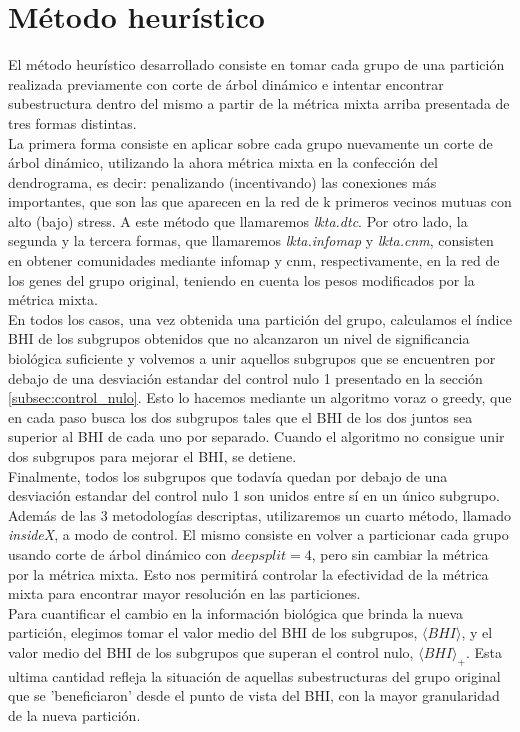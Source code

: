 \section{Método heurístico}
El método heurístico desarrollado consiste en tomar cada grupo de una partición realizada previamente con corte de árbol dinámico e intentar encontrar subestructura dentro del mismo a partir de la métrica mixta arriba presentada de tres formas distintas.\\
La primera forma consiste en aplicar sobre cada grupo nuevamente un corte de árbol dinámico, utilizando la ahora métrica mixta en la confección del dendrograma, es decir: penalizando (incentivando) las conexiones más importantes, que son las que aparecen en la red de k primeros vecinos mutuas con alto (bajo) stress. A este método que llamaremos \textit{lkta.dtc}. Por otro lado, la segunda y la tercera formas, que llamaremos \textit{lkta.infomap} y \textit{lkta.cnm}, consisten en obtener comunidades mediante infomap y cnm, respectivamente, en la red de los genes del grupo original, teniendo en cuenta los pesos modificados por la métrica mixta.\\
En todos los casos, una vez obtenida una partición del grupo, calculamos el índice BHI de los subgrupos obtenidos que no alcanzaron un nivel de significancia biológica suficiente y volvemos a unir aquellos subgrupos que se encuentren por debajo de una desviación estandar del control nulo 1 presentado en la sección \ref{subsec:control_nulo}. Esto lo hacemos mediante un algoritmo voraz o greedy, que en cada paso busca los dos subgrupos tales que el BHI de los dos juntos sea superior al BHI de cada uno por separado. Cuando el algoritmo no consigue unir dos subgrupos para mejorar el BHI, se detiene.\\ Finalmente, todos los subgrupos que todavía quedan por debajo de una desviación estandar del control nulo 1 son unidos entre sí en un único subgrupo.\\
Además de las 3 metodologías descriptas, utilizaremos un cuarto método, llamado \textit{insideX}, a modo de control. El mismo consiste en volver a particionar cada grupo usando corte de árbol dinámico con $deepsplit=4$, pero sin cambiar la métrica por la métrica mixta. Esto nos permitirá controlar la efectividad de la métrica mixta para encontrar mayor resolución en las particiones.\\
Para cuantificar el cambio en la información biológica que brinda la nueva partición, elegimos tomar el valor medio del BHI de los subgrupos, $\langle BHI \rangle$, y el valor medio del BHI de los subgrupos que superan el control nulo, $\langle BHI \rangle _{+}$. Esta ultima cantidad refleja la situación de aquellas subestructuras del grupo original que se 'beneficiaron' desde el punto de vista del BHI, con la mayor granularidad de la nueva partición.\\
